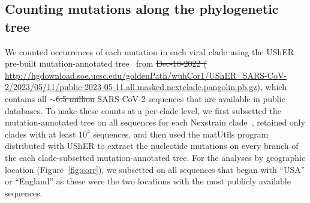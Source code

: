 \documentclass[9pt,twocolumn,twoside]{gsajnl_modified}
\providecommand{\DIFadd}[1]{{\protect\color{blue}\uwave{#1}}} %
\providecommand{\DIFdel}[1]{{\protect\color{red}\sout{#1}}}                      %
\providecommand{\DIFaddbegin}{} %
\providecommand{\DIFaddend}{} %
\providecommand{\DIFdelbegin}{} %
\providecommand{\DIFdelend}{} %
\begin{document}
{\DIFaddend \subsection{Counting mutations along the phylogenetic tree}
We counted occurrences of each mutation in each viral clade using the UShER pre-built mutation-annotated tree~\citep{mcbroome2021daily,turakhia2021ultrafast,lanfear2020} from \DIFdelbegin \DIFdel{Dec-18-2022 (}%
\DIFdelend \DIFaddbegin \DIFadd{May-11-2023 (}\url{http://hgdownload.soe.ucsc.edu/goldenPath/wuhCor1/UShER_SARS-CoV-2/2023/05/11/public-2023-05-11.all.masked.nextclade.pangolin.pb.gz}\DIFaddend ), which contains all $\sim$\DIFdelbegin \DIFdel{6.5-million }\DIFdelend \DIFaddbegin \DIFadd{7-million }\DIFaddend SARS-CoV-2 sequences that are available in public databases.
To make these counts at a per-clade level, we first subsetted the mutation-annotated tree on all sequences for each Nexstrain clade~\citep{aksamentov2021nextclade}, retained only clades with at least $10^4$ sequences, and then used the matUtils program distributed with UShER to extract the nucleotide mutations on every branch of the each clade-subsetted mutation-annotated tree.
For the analyses by geographic location (Figure~\ref{fig:corr}), we subsetted on all sequences that began with ``USA'' or ``England'' as these were the two locations with the most publicly available sequences.

}
\end{document}
